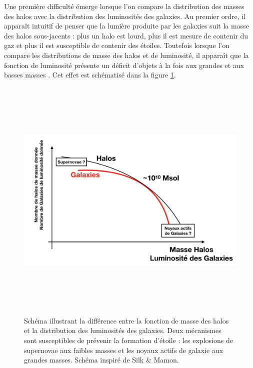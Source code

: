 Une première difficulté émerge lorsque l'on compare la distribution des masses des halos avec la distribution des luminosités des galaxies. Au premier ordre, il apparaît intuitif de penser que la lumière produite par les galaxies suit la masse des halos sous-jacents : plus un halo est lourd, plus il est mesure de contenir du gaz et plus il est susceptible de contenir des étoiles. Toutefois lorsque l'on compare les distributions de masse des halos et de luminosité, il apparaît que la fonction de luminosité présente un déficit d'objets à la fois aux grandes et aux basses masses . Cet effet est schématisé dans la figure \ref{f:silkmamon}.
\begin{figure}[htbp]
	\centering
		\includegraphics[height=12cm]{figs/SilkMamon.png}
	\caption[Schéma illustrant la différence entre la fonction de masse des halos et la distribution des luminosité des galaxies]{Schéma illustrant la différence entre la fonction de masse des halos et la distribution des luminosités des galaxies. Deux mécanismes sont susceptibles de prévenir la formation d'étoile : les explosions de supernovae aux faibles masses et les noyaux actifs de galaxie aux grandes masses.  Schéma inspiré de Silk \& Mamon. } 
	\label{f:silkmamon}
\end{figure}
